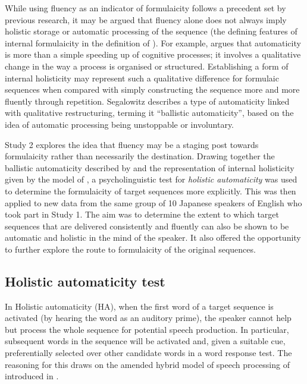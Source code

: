 \documentclass[output=paper]{langscibook}
\begin{document}
While using fluency as an indicator of formulaicity follows a precedent set by previous research, it may be argued that fluency alone does not always imply holistic storage or automatic processing of the sequence (the defining features of internal formulaicity in the definition of \citealt{MylesCordier2017}). For example, \citet{Segalowitz2010} argues that automaticity is more than a simple speeding up of cognitive processes; it involves a qualitative change in the way a process is organised or structured. Establishing a form of internal holisticity may represent such a qualitative difference for formulaic sequences when compared with simply constructing the sequence more and more fluently through repetition. Segalowitz describes a type of automaticity linked with qualitative restructuring, terming it ``ballistic automaticity'', based on the idea of automatic processing being unstoppable or involuntary. 

Study 2 explores the idea that fluency may be a staging post towards formulaicity rather than necessarily the destination. Drawing together the ballistic automaticity described by \citet{Segalowitz2010} and the representation of internal holisticity given by the model of \citet{SprengerEtAl2006}, a psycholinguistic test for \textit{holistic automaticity} was used to determine the formulaicity of target sequences more explicitly. This was then applied to new data from the same group of 10 Japanese speakers of English who took part in Study 1. The aim was to determine the extent to which target sequences that are delivered consistently and fluently can also be shown to be automatic and holistic in the mind of the speaker. It also offered the opportunity to further explore the route to formulaicity of the original sequences. 

\subsection{Holistic automaticity test}\label{sec:cutler:3.2}

In Holistic automaticity (HA), when the first word of a target sequence is activated (by hearing the word as an auditory prime), the speaker cannot help but process the whole sequence for potential speech production. In particular, subsequent words in the sequence will be activated and, given a suitable cue, preferentially selected over other candidate words in a word response test. The reasoning for this draws on the amended hybrid model of speech processing of \citet{SprengerEtAl2006} introduced in .
\end{document}
